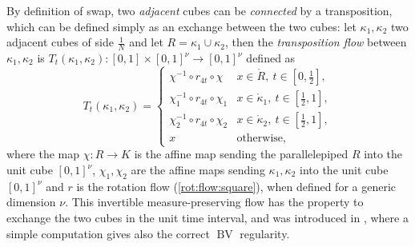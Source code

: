 \documentclass[12 pt]{article}
\theoremstyle{definition} \newtheorem{definition}{Definition}[section]
\theoremstyle{definition} \newtheorem{remark}[definition]{Remark}
\theoremstyle{plain} \newtheorem{lemma}[definition]{Lemma}
\theoremstyle{plain} \newtheorem{proposition}[definition]{Proposition}
\theoremstyle{plain} \newtheorem{theorem}[definition]{Theorem}
\theoremstyle{plain} \newtheorem{corollary}[definition]{Corollary}
\theoremstyle{definition} \newtheorem{example}[definition]{Example}
\theoremstyle{definition} \newtheorem{assumption}[definition]{Assumption}
\theoremstyle{definition} \newtheorem{conjecture}[definition]{Conjecture}
\DeclareMathOperator{\BV}{BV}
\newcommand{\1}{\mathbbm 1}
\numberwithin{equation}{section}
\begin{document}
By definition of swap, two \emph{adjacent} cubes can be \emph{connected} by a transposition, which can be defined simply as an exchange between the two cubes: let $\kappa_1,\kappa_2$ two adjacent cubes of side $\frac{1}{N}$ and let $R=\kappa_1\cup \kappa_2$, then the \emph{transposition flow} between $\kappa_1,\kappa_2$ is $T_t(\kappa_1,\kappa_2):[0,1]\times [0,1]^\nu\rightarrow [0,1]^\nu$ defined as
\begin{equation}
	\label{transposition flow}
		T_t(\kappa_1,\kappa_2)=
	\begin{cases}
	\chi^{-1}\circ r_{4t}\circ \chi & x\in \mathring{R}, \ t\in\left[0,\frac{1}{2}\right], \\
		\chi_1^{-1}\circ r_{4t}\circ \chi_1 & x\in\mathring{\kappa}_1, \ t\in\left[\frac{1}{2},1\right], \\
		\chi_2^{-1}\circ r_{4t}\circ \chi_2 & x\in\mathring{\kappa}_2, \ t\in\left[\frac{1}{2},1\right], \\
		x & \text{otherwise},
	\end{cases}
\end{equation}
where the map $\chi:R\rightarrow K$ is the affine map sending the parallelepiped $R$ into the unit cube $[0,1]^\nu$, $\chi_{1},\chi_{2}$ are the affine maps sending $\kappa_1,\kappa_2$ into the unit cube $[0,1]^\nu$ and $r$ is the rotation flow (\ref{rot:flow:square}), when defined for a generic dimension $\nu$. This invertible measure-preserving flow has the property to exchange the two cubes in the unit time interval, and was introduced in \cite{Bianchini_Zizza_residuality}, where a simple computation gives also the correct $\BV$ regularity.
\end{document}
